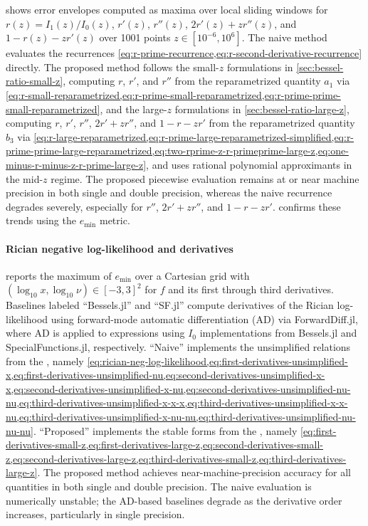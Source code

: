 \documentclass{article}
\begin{document}
 shows error envelopes computed as maxima over local sliding windows for $r(z) = I_1(z) / I_0(z)$, $r'(z)$, $r''(z)$, $2 r'(z) + z r''(z)$, and $1 - r(z) - z r'(z)$ over 1001 points $z \in [10^{-6}, 10^{6}]$.
The naive method evaluates the recurrences \cref{eq:r-prime-recurrence,eq:r-second-derivative-recurrence} directly.
The proposed method follows the small-$z$ formulations in \cref{sec:bessel-ratio-small-z}, computing $r$, $r'$, and $r''$ from the reparametrized quantity $a_1$ via \cref{eq:r-small-reparametrized,eq:r-prime-small-reparametrized,eq:r-prime-prime-small-reparametrized}, and the large-$z$ formulations in \cref{sec:bessel-ratio-large-z}, computing $r$, $r'$, $r''$, $2r'+zr''$, and $1-r-zr'$ from the reparametrized quantity $b_3$ via \cref{eq:r-large-reparametrized,eq:r-prime-large-reparametrized-simplified,eq:r-prime-prime-large-reparametrized,eq:two-rprime-z-r-primeprime-large-z,eq:one-minus-r-minus-z-r-prime-large-z}, and uses rational polynomial approximants in the mid-$z$ regime.
The proposed piecewise evaluation remains at or near machine precision in both single and double precision, whereas the naive recurrence degrades severely, especially for $r''$, $2r'+zr''$, and $1-r-zr'$.
 confirms these trends using the $e_{\min}$ metric.

\paragraph{Rician negative log-likelihood and derivatives}

 reports the maximum of $e_{\min}$ over a Cartesian grid with $(\log_{10} x, \log_{10} \nu) \in [-3, 3]^2$ for $f$ and its first through third derivatives.
Baselines labeled ``Bessels.jl'' and ``SF.jl'' compute derivatives of the Rician log-likelihood using forward-mode automatic differentiation (AD) via ForwardDiff.jl, where AD is applied to expressions using $I_0$ implementations from Bessels.jl and SpecialFunctions.jl, respectively.
``Naive'' implements the unsimplified relations from the , namely \cref{eq:rician-neg-log-likelihood,eq:first-derivatives-unsimplified-x,eq:first-derivatives-unsimplified-nu,eq:second-derivatives-unsimplified-x-x,eq:second-derivatives-unsimplified-x-nu,eq:second-derivatives-unsimplified-nu-nu,eq:third-derivatives-unsimplified-x-x-x,eq:third-derivatives-unsimplified-x-x-nu,eq:third-derivatives-unsimplified-x-nu-nu,eq:third-derivatives-unsimplified-nu-nu-nu}.
``Proposed'' implements the stable forms from the , namely \cref{eq:first-derivatives-small-z,eq:first-derivatives-large-z,eq:second-derivatives-small-z,eq:second-derivatives-large-z,eq:third-derivatives-small-z,eq:third-derivatives-large-z}.
The proposed method achieves near-machine-precision accuracy for all quantities in both single and double precision.
The naive evaluation is numerically unstable; the AD-based baselines degrade as the derivative order increases, particularly in single precision.
\end{document}
